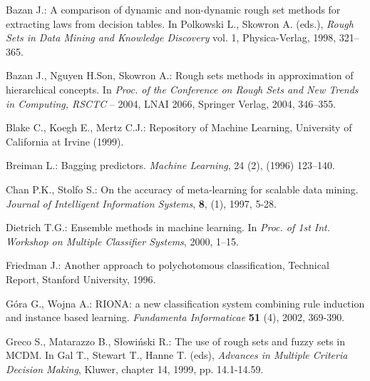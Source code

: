 \documentclass{llncs}
\begin{document}


\begin{thebibliography}{17}


Bazan J.:  A comparison of dynamic and non-dynamic rough set methods for
extracting laws from decision tables. In Polkowski L., Skowron A. (eds.),
{\it Rough Sets in Data Mining and Knowledge Discovery} vol. 1,
Physica-Verlag, 1998, 321--365.

Bazan J., Nguyen H.Son, Skowron A.: Rough sets methods in approximation of
hierarchical concepts. In {\em Proc. of the Conference on Rough Sets and New
Trends in Computing, RSCTC} -- 2004, LNAI 2066, Springer Verlag, 2004,
346--355.

  Blake C., Koegh E., Mertz C.J.: Repository of Machine Learning,
University of California at Irvine (1999).

  Breiman L.:  Bagging predictors. {\em Machine Learning},
24 (2), (1996) 123--140.


  Chan P.K., Stolfo S.: On the accuracy of meta-learning
for scalable data mining. {\em Journal of Intelligent Information Systems},
{\bf 8}, (1), 1997, 5-28.


 Dietrich T.G.: Ensemble methods in machine learning.
In {\em Proc. of 1st Int. Workshop on Multiple Classifier Systems}, 2000,
1--15.

  Friedman J.: Another approach to polychotomous
classification, Technical Report, Stanford University, 1996.


 G\'ora G., Wojna A.: RIONA: a new classification system
combining rule induction and instance based learning. {\em Fundamenta
Informaticae} \textbf{51} (4), 2002, 369-390.

 Greco S., Matarazzo B., S{\l}owi\'nski R.:
The use of rough sets and fuzzy sets in MCDM. In Gal T., Stewart T., Hanne
T. (eds), {\em Advances in Multiple Criteria Decision Making}, Kluwer,
chapter 14, 1999, pp. 14.1-14.59.



\end{thebibliography}
\end{document}
